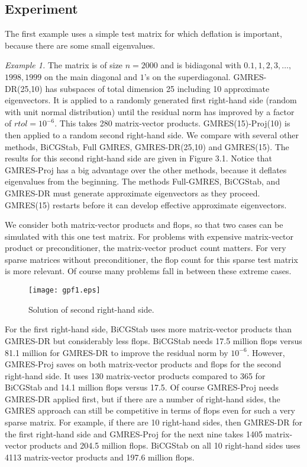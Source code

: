 \documentclass[final]{siamltex}
\begin{document}
\subsection{Experiment}

The first example uses a simple test matrix for which deflation is important, because there are some small eigenvalues.  

{\it Example 1.}
The matrix is of size $n=2000$ and is bidiagonal with $0.1, 1, 2, 3, \ldots,$ $1998, 1999$ on the main diagonal and $1$'s on the superdiagonal.  GMRES-DR(25,10) has subspaces of total dimension 25 including 10 approximate eigenvectors.  It is applied to a randomly generated first right-hand side (random with unit normal distribution) until the residual norm has improved by a factor of $rtol = 10^{-6}$.  This takes 280 matrix-vector products. GMRES(15)-Proj(10) is then applied to a random second right-hand side.  We compare with several other methods, BiCGStab, Full GMRES, GMRES-DR(25,10) and GMRES(15).  The results for this second right-hand side are given in Figure 3.1.  Notice that GMRES-Proj has a big advantage over the other methods, because it deflates eigenvalues from the beginning.  The methods Full-GMRES, BiCGStab, and GMRES-DR must generate approximate eigenvectors as they proceed.  GMRES(15) restarts before it can develop effective approximate eigenvectors.  

We consider both matrix-vector products and flops, so that two cases can be simulated with this one test matrix.  For problems with expensive matrix-vector product or preconditioner, the matrix-vector product count matters.  For very sparse matrices without preconditioner, the flop count for this sparse test matrix is more relevant.  Of course many problems fall in between these extreme cases.

\begin{figure}
\vspace{.10in}
\begin{center}
\texttt{[image: gpf1.eps]}
\end{center}
\vspace{.10in}
\caption{Solution of second right-hand side.}
\end{figure}

For the first right-hand side, BiCGStab uses more matrix-vector products than GMRES-DR but considerably less flops.  BiCGStab needs 17.5 million flops versus 81.1 million for GMRES-DR to improve the residual norm by $10^{-6}$.  However, GMRES-Proj saves on both matrix-vector products and flops for the second right-hand side.  It uses 130 matrix-vector products compared to 365 for BiCGStab and 14.1 million flops versus 17.5.  Of course GMRES-Proj needs GMRES-DR applied first, but if there are a number of right-hand sides, the GMRES approach can still be competitive in terms of flops even for such a very sparse matrix.  For example, if there are 10 right-hand sides, then GMRES-DR for the first right-hand side and GMRES-Proj for the next nine takes 1405 matrix-vector products and 204.5 million flops.  BiCGStab on all 10 right-hand sides uses 4113 matrix-vector products and 197.6 million flops. 
\end{document}

